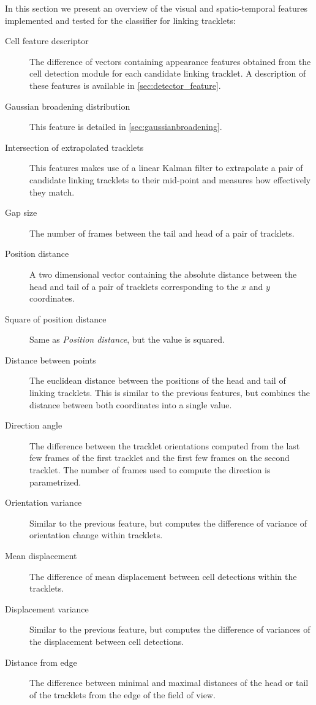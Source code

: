  		In this section we present an overview of the visual and spatio-temporal features implemented and tested for the classifier for linking tracklets:
 		
 		\begin{description}
    		\item[Cell feature descriptor] The difference of vectors containing appearance features obtained from the cell detection module for each candidate linking tracklet. A description of these features is available in \cref{sec:detector_feature}.
    		\item[Gaussian broadening distribution] This feature is detailed in \cref{sec:gaussianbroadening}.
    		\item[Intersection of extrapolated tracklets] This features makes use of a linear Kalman filter \cite{kalman60} to extrapolate a pair of candidate linking tracklets to their mid-point and measures how effectively they match.
    		\item[Gap size] The number of frames between the tail and head of a pair of tracklets.
    		\item[Position distance] A two dimensional vector containing the absolute distance between the head and tail of a pair of tracklets corresponding to the $x$ and $y$ coordinates.
    		\item[Square of position distance] Same as \textit{Position distance}, but the value is squared.
    		\item[Distance between points] The euclidean distance between the positions of the head and tail of linking tracklets. This is similar to the previous features, but combines the distance between both coordinates into a single value.
    		\item[Direction angle] The difference between the tracklet orientations computed from the last few frames of the first tracklet and the first few frames on the second tracklet. The number of frames used to compute the direction is parametrized.
    		\item[Orientation variance] Similar to the previous feature, but computes the difference of variance of orientation change within tracklets.
    		\item[Mean displacement] The difference of mean displacement between cell detections within the tracklets.
    		\item[Displacement variance] Similar to the previous feature, but computes the difference of variances of the displacement between cell detections.
    		\item[Distance from edge] The difference between minimal and maximal distances of the head or tail of the tracklets from the edge of the field of view.
    	\end{description} 		    	
    	
